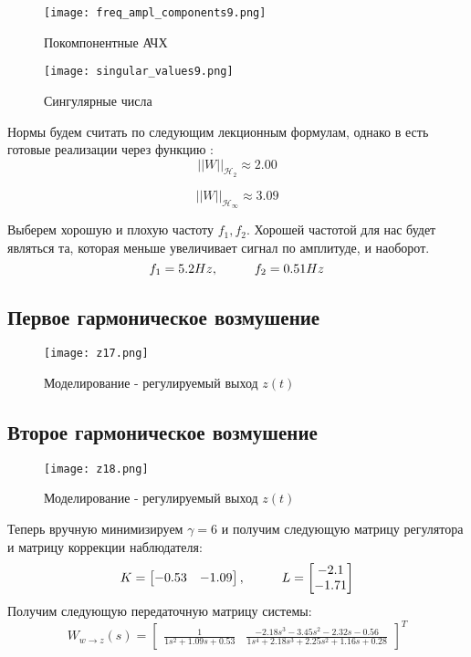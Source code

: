 \begin{figure}[ht]
    \centering
    \texttt{[image: freq\_ampl\_components9.png]}
    \caption{Покомпонентные АЧХ}
  \end{figure}

\begin{figure}[ht]
  \centering
  \texttt{[image: singular\_values9.png]}
  \caption{Сингулярные числа}
\end{figure}
Нормы будем считать по следующим лекционным формулам, однако в  
есть готовые реализации через функцию :
$$
    ||W||_{\mathcal{H}_2}  \approx 2.00
$$

$$
    ||W||_{\mathcal{H}_\infty}  \approx 3.09
$$

Выберем хорошую и плохую частоту $f_1, f_2$. 
Хорошей частотой для нас будет являться та, которая меньше увеличивает сигнал по амплитуде, и наоборот.
$$
    f_1 = 5.2 Hz, \hspace*{1cm} f_2 = 0.51 Hz
$$

\subsection{Первое гармоническое возмушение}
\begin{figure}[ht]
    \centering
    \texttt{[image: z17.png]}
    \caption{Моделирование -  регулируемый выход $z(t)$}
  \end{figure}

\newpage
\subsection{Второе гармоническое возмушение}
\begin{figure}[ht]
    \centering
    \texttt{[image: z18.png]}
    \caption{Моделирование -  регулируемый выход $z(t)$}
  \end{figure}


  Теперь вручную минимизируем $\gamma = 6$ и получим следующую матрицу регулятора и матрицу коррекции наблюдателя: 
  $$
      K = \begin{bmatrix}
        -0.53 & -1.09 \\
    \end{bmatrix}, \hspace*{1cm} 
      L = \begin{bmatrix}
        -2.1 \\
        -1.71 \\
    \end{bmatrix}
  $$
  Получим следующую передаточную матрицу системы:
  $$
      W_{w\rightarrow z}(s) = \begin{bmatrix}\frac{1}{1s^{2} + 1.09s + 0.53} &  \frac{-2.18s^{3} - 3.45s^{2} - 2.32s - 0.56}{1s^{4} + 2.18s^{3} + 2.25s^{2} + 1.16s + 0.28} \end{bmatrix}^T
  $$
  
